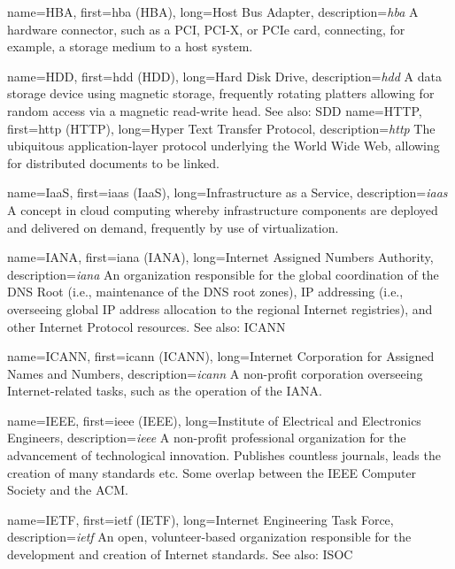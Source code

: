 {
	name={HBA},
	first={\acrlong{hba} (HBA)},
	long={Host Bus Adapter},
	description={{\em \acrlong{hba}} A hardware connector, such as a PCI,
PCI-X, or PCIe card, connecting, for example, a storage medium to a host
system.}
}

{
	name={HDD},
	first={\acrlong{hdd} (HDD)},
	long={Hard Disk Drive},
	description={{\em \acrlong{hdd}} A data
storage device using magnetic storage, frequently
rotating platters allowing for random access via a
magnetic read-write head.  See also: SDD}
}
{
	name={HTTP},
	first={\acrlong{http} (HTTP)},
	long={Hyper Text Transfer Protocol},
	description={{\em \acrlong{http}} The ubiquitous
application-layer protocol underlying the World Wide Web, allowing for
distributed documents to be linked.}
}

{
	name={IaaS},
	first={\acrlong{iaas} (IaaS)},
	long={Infrastructure as a Service},
	description={{\em \acrlong{iaas}} A concept in cloud computing
whereby infrastructure components are deployed and delivered on demand,
frequently by use of virtualization.}
}

{
	name={IANA},
	first={\acrlong{iana} (IANA)},
	long={Internet Assigned Numbers Authority},
	description={{\em \acrlong{iana}} An organization
responsible for the global coordination of the DNS Root (i.e., maintenance of
the DNS root zones), IP addressing (i.e., overseeing global IP address
allocation to the regional Internet registries), and other Internet
Protocol resources.  See also: ICANN}
}

{
	name={ICANN},
	first={\acrlong{icann} (ICANN)},
	long={Internet Corporation for Assigned Names and Numbers},
	description={{\em \acrlong{icann}} A
non-profit corporation overseeing Internet-related tasks, such as the
operation of the IANA.}
}

{
	name={IEEE},
	first={\acrlong{ieee} (IEEE)},
	long={Institute of Electrical and Electronics Engineers},
	description={{\em \acrlong{ieee}} A
non-profit professional organization for the advancement of technological
innovation.  Publishes countless journals, leads the creation of many
standards etc.  Some overlap between the IEEE Computer Society and the
ACM.}
}

{
	name={IETF},
	first={\acrlong{ietf} (IETF)},
	long={Internet Engineering Task Force},
	description={{\em \acrlong{ietf}} An open, volunteer-based
organization responsible for the development and creation of Internet
standards.  See also: ISOC}
}

